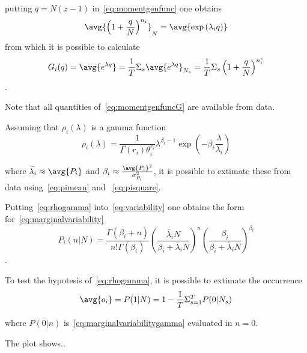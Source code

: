 putting $q=N(z-1)$ in~\ref{eq:momentgenfunc} one obtains
\[
\avg{\left(1+\frac{q}{N}\right)^{n_{i}}}_{N}=\avg{\exp \left(\lambda_{i} q\right)}
\] from which it is possible to calculate
\begin{equation}\label{eq:momentgenfuncG}
G_i(q)=\avg{e^{\lambda q}}=\frac{1}{T}\Sigma_s \avg{e^{\lambda 
q}}_{N_s}=\frac{1}{T}\Sigma_s \left(1+\frac{q}{N}\right)^{n_{i}^s}
\end{equation}.

Note that all quantities of~\ref{eq:momentgenfuncG} are available from data.

Assuming that $\rho_i(\lambda)$ is a gamma function
\begin{equation}\label{eq:rhogamma}
  \rho_{i}(\lambda)=\frac{1}{\Gamma\left(r_{i}\right) \theta_{i}^{r_{i}}} \lambda^{\beta_{i}-1} \exp \left(-\beta_{i} \frac{\lambda}{\lambda_{i}}\right)
\end{equation}

where $\bar{\lambda_i}\approx \avg{P_i}$ and 
$\beta_i\approx\frac{\avg{P_i}^2}{\sigma_{P_i}^2}$, it is possible to extimate 
these from data using~\ref{eq:pimean} and ~\ref{eq:pisquare}.

Putting~\ref{eq:rhogamma} into~\ref{eq:variability} one obtains the form for~\ref{eq:marginalvariability}
\begin{equation}\label{eq:marginalvariabilitygamma}
  P_{i}\left(n | N\right)=\frac{\Gamma\left(\beta_{i}+n\right)}{n! \Gamma\left(\beta_{i}\right)}\left(\frac{\overline{\lambda}_{i} N}{\beta_{i}+\overline{\lambda}_{i} N}\right)^{n}\left(\frac{\beta_{i}}{\beta_{i}+\overline{\lambda}_{i} N}\right)^{\beta_{i}}
\end{equation}.

To test the hypotesis of~\ref{eq:rhogamma}, it is possible to extimate the 
occurrence
\begin{equation}
  \avg{o_i}=P(1|N)=1-\frac{1}{T}\Sigma_{s=1}^T P(0|N_s)
\end{equation}

where $P(0|n)$ is~\ref{eq:marginalvariabilitygamma} evaluated in $n=0$.

The plot shows..

